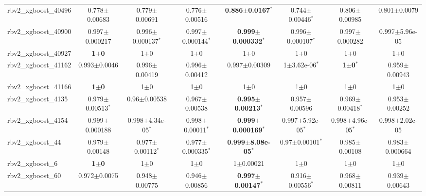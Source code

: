 \begin{table}[t]
\begin{center}
\begin{tabular}{lccccccc}
rbv2\_xgboost\_40496 & 0.778$\pm$0.00683 & 0.779$\pm$0.00691 & 0.776$\pm$0.00516 & \textbf{0.886$\pm$0.0167}$^{*}$ & 0.744$\pm$0.00446$^{*}$ & 0.806$\pm$0.00985 & 0.801$\pm$0.0079 \\
rbv2\_xgboost\_40900 & 0.997$\pm$0.000217 & 0.996$\pm$0.000137$^{*}$ & 0.997$\pm$0.000144$^{*}$ & \textbf{0.999$\pm$0.000332}$^{*}$ & 0.996$\pm$0.000107$^{*}$ & 0.997$\pm$0.000282 & 0.997$\pm$5.96e-05 \\
rbv2\_xgboost\_40927 & \textbf{1$\pm$0} & 1$\pm$0 & 1$\pm$0 & 1$\pm$0 & 1$\pm$0 & 1$\pm$0 & 1$\pm$0 \\
rbv2\_xgboost\_41162 & 0.993$\pm$0.0046 & 0.996$\pm$0.00419 & 0.996$\pm$0.00412 & 0.997$\pm$0.00309 & 1$\pm$3.62e-06$^{*}$ & \textbf{1$\pm$0}$^{*}$ & 0.959$\pm$0.00943 \\
rbv2\_xgboost\_41166 & \textbf{1$\pm$0} & 1$\pm$0 & 1$\pm$0 & 1$\pm$0 & 1$\pm$0 & 1$\pm$0 & 1$\pm$0 \\
rbv2\_xgboost\_4135 & 0.979$\pm$0.00513$^{*}$ & 0.96$\pm$0.00538 & 0.967$\pm$0.00538 & \textbf{0.995$\pm$0.00213}$^{*}$ & 0.957$\pm$0.00596 & 0.969$\pm$0.00418$^{*}$ & 0.953$\pm$0.00252 \\
rbv2\_xgboost\_4154 & 0.999$\pm$0.000188 & 0.998$\pm$4.34e-05$^{*}$ & 0.998$\pm$0.00011$^{*}$ & \textbf{0.999$\pm$0.000169}$^{*}$ & 0.997$\pm$5.92e-05$^{*}$ & 0.998$\pm$4.96e-05$^{*}$ & 0.998$\pm$2.02e-05 \\
rbv2\_xgboost\_44 & 0.979$\pm$0.00148 & 0.977$\pm$0.00112$^{*}$ & 0.977$\pm$0.000335$^{*}$ & \textbf{0.999$\pm$8.08e-05}$^{*}$ & 0.97$\pm$0.00101$^{*}$ & 0.985$\pm$0.00108 & 0.983$\pm$0.000664 \\
rbv2\_xgboost\_6 & \textbf{1$\pm$0} & 1$\pm$0 & 1$\pm$0 & 1$\pm$0.00021 & 1$\pm$0 & 1$\pm$0 & 1$\pm$0 \\
rbv2\_xgboost\_60 & 0.972$\pm$0.0075 & 0.948$\pm$0.00775 & 0.946$\pm$0.00856 & \textbf{0.997$\pm$0.00147}$^{*}$ & 0.916$\pm$0.00556$^{*}$ & 0.968$\pm$0.00811 & 0.939$\pm$0.00643 \\
\hline
\end{tabular}
\end{center}
\end{table}